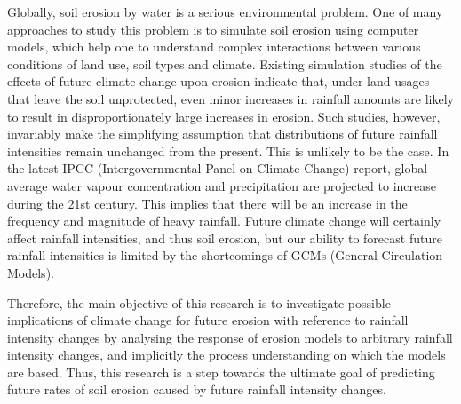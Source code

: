 \begin{abstractseparate}
\noindent
Globally, soil erosion by water is a serious environmental problem. One of many
approaches to study this problem is to simulate soil erosion using computer
models, which help one to understand complex interactions between various
conditions of land use, soil types and climate.
%
Existing simulation studies of the effects of future climate change upon erosion
indicate that, under land usages that leave the soil unprotected, even minor
increases in rainfall amounts are likely to result in disproportionately large
increases in erosion. Such studies, however, invariably make the simplifying
assumption that distributions of future rainfall intensities remain unchanged
from the present. This is unlikely to be the case. In the latest IPCC
(Intergovernmental Panel on Climate Change) report, global average water vapour
concentration and precipitation are projected to increase during the 21st
century. This implies that there will be an increase in the frequency and
magnitude of heavy rainfall. Future climate change will certainly affect
rainfall intensities, and thus soil erosion, but our ability to forecast future
rainfall intensities is limited by the shortcomings of GCMs (General Circulation
Models).

Therefore, the main objective of this research is to investigate possible
implications of climate change for future erosion with reference to rainfall
intensity changes by analysing the response of erosion models to arbitrary
rainfall intensity changes, and implicitly the process understanding on which
the models are based.
Thus, this research is a step towards the ultimate goal of predicting future
rates of soil erosion caused by future rainfall intensity changes.


\end{abstractseparate}
